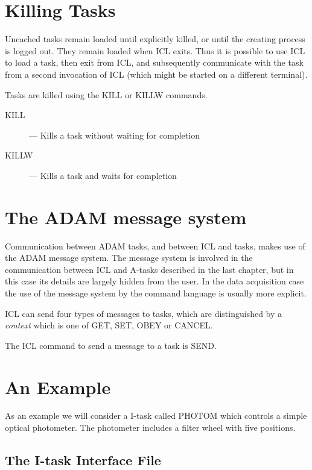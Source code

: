 \documentclass[twoside,11pt]{report}
\newcommand{\xlabel}[1]{}
\begin{document}
\section{\xlabel{killing_tasks}Killing Tasks}

Uncached tasks remain loaded until explicitly killed, or until the creating
process is logged out. They remain loaded when ICL exits. Thus it is possible
to use ICL to load a task, then exit from ICL, and subsequently communicate
with the task from a second invocation of ICL (which might be started on
a different terminal).

Tasks are killed using the KILL or KILLW commands.

\begin{description}

\item[KILL] --- Kills a task without waiting for completion

\item[KILLW] --- Kills a task and waits for completion

\end{description}

\section{\xlabel{the_adam_message_system}The ADAM message system}

Communication between ADAM tasks, and between ICL and tasks, makes use of
the ADAM message system. The message system is involved in the communication
between ICL and A-tasks described in the last chapter, but in this case
its details are largely hidden from the user. In the data acquisition case
the use of the message system by the command language is usually more explicit.

ICL can send four types of messages to tasks, which are distinguished by
a {\em context} which is one of GET, SET, OBEY or CANCEL.

The ICL command to send a message to a task is SEND.

\section{\xlabel{an_example}An Example}

As an example we will consider a I-task called PHOTOM which controls a simple
optical photometer. The photometer includes a filter wheel with five positions.

\subsection{\xlabel{the_itask_interface_file}The I-task Interface File}
\end{document}
